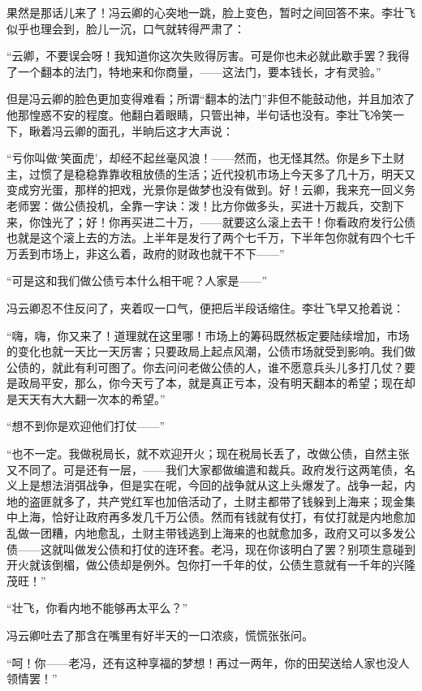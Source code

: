 \par 果然是那话儿来了！冯云卿的心突地一跳，脸上变色，暂时之间回答不来。李壮飞似乎也理会到，脸儿一沉，口气就转得严肃了：
\par “云卿，不要误会呀！我知道你这次失败得厉害。可是你也未必就此歇手罢？我得了一个翻本的法门，特地来和你商量，——这法门，要本钱长，才有灵验。”
\par 但是冯云卿的脸色更加变得难看；所谓“翻本的法门”非但不能鼓动他，并且加浓了他那惶惑不安的程度。他翻白着眼睛，只管出神，半句话也没有。李壮飞冷笑一下，瞅着冯云卿的面孔，半晌后这才大声说：
\par “亏你叫做‘笑面虎’，却经不起丝毫风浪！——然而，也无怪其然。你是乡下土财主，过惯了是稳稳靠靠收租放债的生活；近代投机市场上今天多了几十万，明天又变成穷光蛋，那样的把戏，光景你是做梦也没有做到。好！云卿，我来充一回义务老师罢：做公债投机，全靠一字诀：泼！比方你做多头，买进十万裁兵，交割下来，你蚀光了；好！你再买进二十万，——就要这么滚上去干！你看政府发行公债也就是这个滚上去的方法。上半年是发行了两个七千万，下半年包你就有四个七千万丢到市场上，非这么着，政府的财政也就干不下——”
\par “可是这和我们做公债亏本什么相干呢？人家是——”
\par 冯云卿忍不住反问了，夹着叹一口气，便把后半段话缩住。李壮飞早又抢着说：
\par “嗨，嗨，你又来了！道理就在这里哪！市场上的筹码既然板定要陆续增加，市场的变化也就一天比一天厉害；只要政局上起点风潮，公债市场就受到影响。我们做公债的，就此有利可图了。你去问问老做公债的人，谁不愿意兵头儿多打几仗？要是政局平安，那么，你今天亏了本，就是真正亏本，没有明天翻本的希望；现在却是天天有大大翻一次本的希望。”
\par “想不到你是欢迎他们打仗——”
\par “也不一定。我做税局长，就不欢迎开火；现在税局长丢了，改做公债，自然主张又不同了。可是还有一层，——我们大家都做编遣和裁兵。政府发行这两笔债，名义上是想法消弭战争，但是实在呢，今回的战争就从这上头爆发了。战争一起，内地的盗匪就多了，共产党红军也加倍活动了，土财主都带了钱躲到上海来；现金集中上海，恰好让政府再多发几千万公债。然而有钱就有仗打，有仗打就是内地愈加乱做一团糟，内地愈乱，土财主带钱逃到上海来的也就愈加多，政府又可以多发公债——这就叫做发公债和打仗的连环套。老冯，现在你该明白了罢？别项生意碰到开火就该倒楣，做公债却是例外。包你打一千年的仗，公债生意就有一千年的兴隆茂旺！”
\par “壮飞，你看内地不能够再太平么？”
\par 冯云卿吐去了那含在嘴里有好半天的一口浓痰，慌慌张张问。
\par “呵！你——老冯，还有这种享福的梦想！再过一两年，你的田契送给人家也没人领情罢！”
